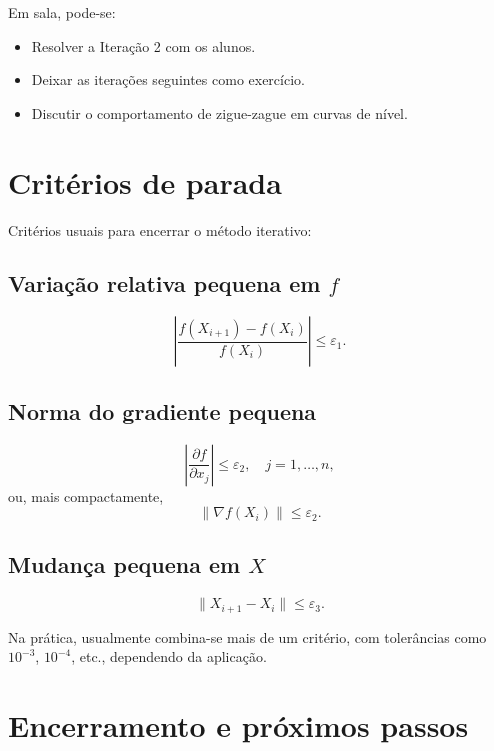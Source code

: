 \documentclass[9pt,a4paper]{extarticle}
\begin{document}
\noindent Em sala, pode-se:
\begin{itemize}
    \item Resolver a Iteração 2 com os alunos.
    \item Deixar as iterações seguintes como exercício.
    \item Discutir o comportamento de zigue-zague em curvas de nível.
\end{itemize}

\section{Critérios de parada}

Critérios usuais para encerrar o método iterativo:

\subsection{Variação relativa pequena em $f$}

\[
  \left|
  \frac{f(X_{i+1}) - f(X_i)}{f(X_i)}
  \right|
  \leq \varepsilon_1.
\]

\subsection{Norma do gradiente pequena}

\[
  \left| \frac{\partial f}{\partial x_j} \right| \leq \varepsilon_2,
  \quad j=1,\dots,n,
\]
ou, mais compactamente,
\[
  \|\nabla f(X_i)\| \leq \varepsilon_2.
\]

\subsection{Mudança pequena em $X$}

\[
  \|X_{i+1} - X_i\| \leq \varepsilon_3.
\]

\noindent Na prática, usualmente combina-se mais de um critério, com tolerâncias como $10^{-3}$, $10^{-4}$, etc., dependendo da aplicação.

\section{Encerramento e próximos passos}
\end{document}
